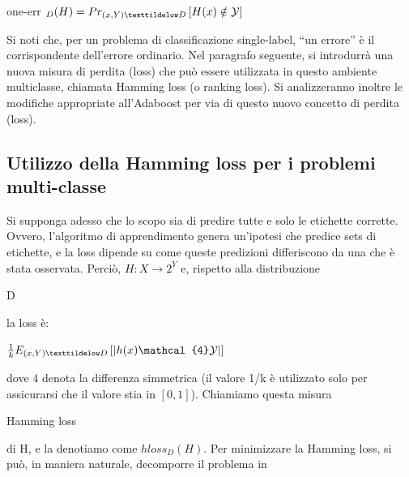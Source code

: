 \begin{center}one-err
 \begin{math}
  _D(H) = Pr_{(x,Y) \texttildelow D}\left[H(x) \notin \mathcal{Y}\right]
 \end{math}

\end{center}
Si noti che, per un problema di classificazione single-label, ``un errore'' \`e il corrispondente dell'errore 
ordinario. Nel paragrafo seguente, si introdurr\`a una nuova misura di perdita (loss) che pu\`o essere utilizzata 
in questo ambiente multiclasse, chiamata Hamming loss (o ranking loss). Si analizzeranno inoltre le modifiche 
appropriate all'Adaboost per via di questo nuovo concetto di perdita (loss).

\subsection{Utilizzo della Hamming loss per i problemi multi-classe}
Si supponga adesso che lo scopo sia di predire tutte e solo le etichette corrette. Ovvero, l'algoritmo 
di apprendimento genera un'ipotesi che predice sets di etichette, e la loss dipende su come queste predizioni 
differiscono da una che \`e stata osservata. Perci\`o, 
\begin{math} H : X \rightarrow 2^Y\end{math} e, rispetto alla distribuzione \begin{it} D\end{it} 
la loss \`e:
\begin{center}
 \begin{math}
 \frac{1}{k} E_{(x,Y) \texttildelow  D} \left[|h(x) \mathcal{4} \mathcal{Y} | \right]
 \end{math}
\end{center}
dove \begin{math}
      \mathcal{4}
     \end{math} denota la differenza simmetrica (il valore 1/k \`e utilizzato solo per assicurarsi che 
il valore stia in \begin{math}
                   \left[0,1\right]
                  \end{math}). Chiamiamo questa misura \begin{it}
                                                        Hamming loss
                                                       \end{it} di H, e la denotiamo come
\begin{math}
 hloss_D(H)
\end{math}. Per minimizzare la Hamming loss, si pu\`o, in maniera naturale, decomporre il problema in 
